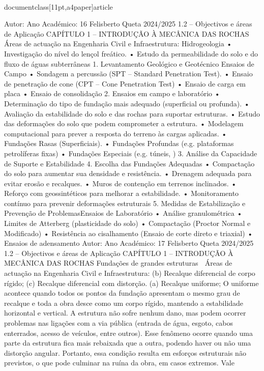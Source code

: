 \\documentclass[11pt,a4paper]{article}
\begin{document}
Autor:
Ano Académico:
16
Felisberto Queta
2024/2025
1.2 – Objectivos e áreas de Aplicação
CAPÍTULO 1 
–
 INTRODUÇÃO À MECÂNICA DAS ROCHAS
 Áreas de actuação na Engenharia Civil e Infraestrutura:
Hidrogeologia
• Investigação do nível do lençol freático.
• Estudo da permeabilidade do solo e do fluxo de águas 
subterrâneas
1. Levantamento Geológico e Geotécnico
Ensaios de Campo
• Sondagem a percussão (SPT – Standard Penetration Test).
• Ensaio de penetração de cone (CPT – Cone Penetration
Test)
• Ensaio de carga em placa
• Ensaio de consolidação
2. Ensaios em campo e laboratório
• Determinação do tipo de fundação mais adequado (superficial ou 
profunda).
• Avaliação da estabilidade do solo e das rochas para suportar 
estruturas.
• Estudo das deformações do solo que podem comprometer a 
estrutura.
• Modelagem computacional para prever a resposta do terreno às 
cargas aplicadas.
• Fundações Rasas (Superficiais).
• Fundações Profundas (e.g. plataformas petrolíferas fixas)
• Fundações Especiais (e.g. túneis, )
3. Análise da Capacidade de Suporte e Estabilidade
4. Escolha das Fundações Adequadas
• Compactação do solo para aumentar sua densidade e 
resistência.
• Drenagem adequada para evitar erosão e recalques.
• Muros de contenção em terrenos inclinados.
• Reforço com geossintéticos para melhorar a estabilidade.
• Monitoramento contínuo para prevenir deformações estruturais
5. Medidas de Estabilização e Prevenção de ProblemasEnsaios de Laboratório
• Análise granulométrica
• Limites de Atterberg (plasticidade do solo)
• Compactação (Proctor Normal e Modificado)
• Resistência ao cisalhamento (Ensaio de corte direto e 
triaxial)
• Ensaios de adensamento
Autor:
Ano Académico:
17
Felisberto Queta
2024/2025
1.2 – Objectivos e áreas de Aplicação
CAPÍTULO 1 
–
 INTRODUÇÃO À MECÂNICA DAS ROCHAS
Fundações de grandes estruturas
 Áreas de actuação na Engenharia Civil e Infraestrutura:
(b) Recalque diferencial de corpo 
rígido; 
(c) Recalque diferencial com 
distorção. (a) Recalque uniforme; 
O uniforme acontece quando todos os 
pontos da fundação apresentam o mesmo 
grau de recalque e toda a obra desce como 
um corpo rígido, mantendo a estabilidade 
horizontal e vertical. A estrutura não sofre 
nenhum dano, mas podem ocorrer problemas 
nas ligações com a via pública (entrada de 
água, esgoto, cabos enterrados, acesso de 
veículos, entre outros).
Esse fenômeno ocorre quando uma 
parte da estrutura fica mais rebaixada 
que a outra, podendo haver ou não uma 
distorção angular. Portanto, essa 
condição resulta em esforços estruturais 
não previstos, o que pode culminar na 
ruína da obra, em casos extremos. Vale 
\end{document}
